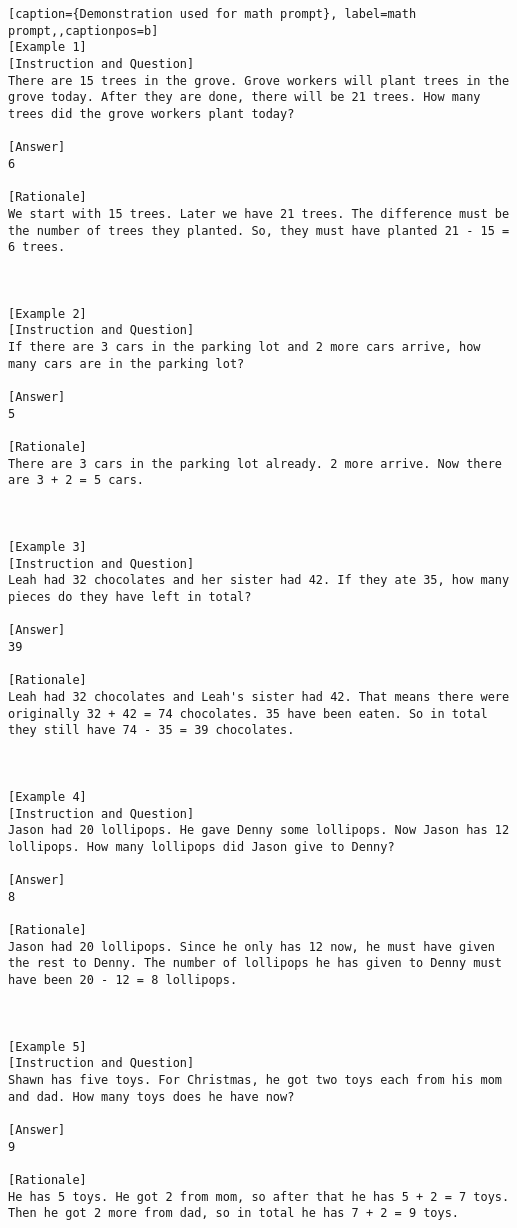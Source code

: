 \begin{lstlisting}[caption={Demonstration used for math prompt}, label=math prompt,,captionpos=b]
[Example 1]
[Instruction and Question] 
There are 15 trees in the grove. Grove workers will plant trees in the grove today. After they are done, there will be 21 trees. How many trees did the grove workers plant today?

[Answer]
6

[Rationale]
We start with 15 trees. Later we have 21 trees. The difference must be the number of trees they planted. So, they must have planted 21 - 15 = 6 trees.



[Example 2]
[Instruction and Question] 
If there are 3 cars in the parking lot and 2 more cars arrive, how many cars are in the parking lot?

[Answer] 
5

[Rationale]
There are 3 cars in the parking lot already. 2 more arrive. Now there are 3 + 2 = 5 cars. 



[Example 3]
[Instruction and Question] 
Leah had 32 chocolates and her sister had 42. If they ate 35, how many pieces do they have left in total?

[Answer] 
39

[Rationale]
Leah had 32 chocolates and Leah's sister had 42. That means there were originally 32 + 42 = 74 chocolates. 35 have been eaten. So in total they still have 74 - 35 = 39 chocolates. 



[Example 4]
[Instruction and Question] 
Jason had 20 lollipops. He gave Denny some lollipops. Now Jason has 12 lollipops. How many lollipops did Jason give to Denny?

[Answer] 
8

[Rationale]
Jason had 20 lollipops. Since he only has 12 now, he must have given the rest to Denny. The number of lollipops he has given to Denny must have been 20 - 12 = 8 lollipops. 



[Example 5]
[Instruction and Question] 
Shawn has five toys. For Christmas, he got two toys each from his mom and dad. How many toys does he have now?

[Answer] 
9

[Rationale]
He has 5 toys. He got 2 from mom, so after that he has 5 + 2 = 7 toys. Then he got 2 more from dad, so in total he has 7 + 2 = 9 toys. 




\end{lstlisting}
